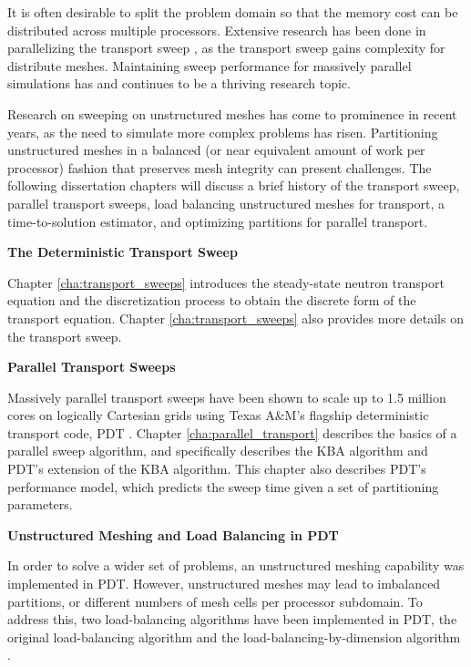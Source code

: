 {It is often desirable to split the problem domain so that the memory cost can be distributed across multiple processors.
Extensive research has been done in parallelizing the transport sweep \cite{KBA,partisn,denovo,mpadams2013,mpadams2015}, as the transport sweep gains complexity for distribute meshes. Maintaining sweep performance for massively parallel simulations has and continues to be a thriving research topic.

Research on sweeping on unstructured meshes has come to prominence in recent years, as the need to simulate more complex problems has risen.
Partitioning unstructured meshes in a balanced (or near equivalent amount of work per processor) fashion that preserves mesh integrity can present challenges.
The following dissertation chapters will discuss a brief history of the transport sweep, parallel transport sweeps, load balancing unstructured meshes for transport, a time-to-solution estimator, and optimizing partitions for parallel transport.

\noindent \textbf{The Deterministic Transport Sweep}

Chapter \ref{cha:transport_sweeps} introduces the steady-state neutron transport equation and the discretization process to obtain the discrete form of the transport equation. Chapter \ref{cha:transport_sweeps} also provides more details on the transport sweep.

\noindent \textbf{Parallel Transport Sweeps}

Massively parallel transport sweeps have been shown to scale up to 1.5 million cores on logically Cartesian grids using Texas A\&M's flagship deterministic transport code, PDT \cite{mpadams2013,mpadams2015}.
Chapter \ref{cha:parallel_transport} describes the basics of a parallel sweep algorithm, and specifically describes the KBA algorithm \cite{KBA} and PDT's extension of the KBA algorithm.
This chapter also describes PDT's performance model, which predicts the sweep time given a set of partitioning parameters.

\noindent \textbf{Unstructured Meshing and Load Balancing in PDT}

In order to solve a wider set of problems, an unstructured meshing capability was implemented in PDT.
However, unstructured meshes may lead to imbalanced partitions, or different numbers of mesh cells per processor subdomain.
To address this, two load-balancing algorithms have been implemented in PDT, the original load-balancing algorithm and the load-balancing-by-dimension algorithm \cite{mastersthesis,mc2017}.

}

